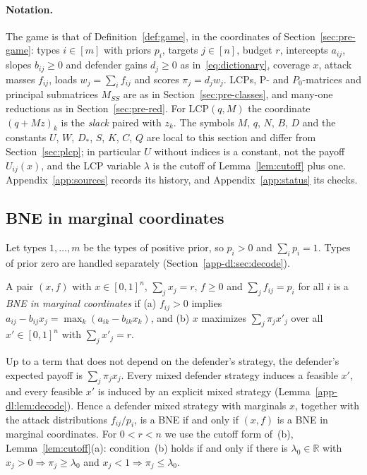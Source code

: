\paragraph{Notation.} The game is that of Definition~\ref{def:game}, in the coordinates of
Section~\ref{sec:pre-game}: types $i\in[m]$ with priors $p_i$, targets $j\in[n]$, budget $r$, intercepts
$a_{ij}$, slopes $b_{ij}\ge0$ and defender gains $d_j\ge0$ as in~\eqref{eq:dictionary}, coverage $x$,
attack masses $f_{ij}$, loads $w_j=\sum_if_{ij}$ and scores $\pi_j=d_jw_j$. LCPs, P- and $P_0$-matrices
and principal submatrices $M_{SS}$ are as in Section~\ref{sec:pre-classes}, and many-one reductions as in
Section~\ref{sec:pre-red}. For $\mathrm{LCP}(q,M)$ the coordinate $(q+Mz)_k$ is the \emph{slack} paired
with $z_k$. The symbols $M$, $q$, $N$, $B$, $D$ and the constants $U$, $W$, $D_*$, $S$, $K$, $C$, $Q$ are
local to this section and differ from Section~\ref{sec:plcp}; in particular $U$ without indices is a constant,
not the payoff $U_{ij}(x)$, and the LCP variable $\lambda$ is the cutoff of Lemma~\ref{lem:cutoff} plus
one. Appendix~\ref{app:sources} records its history, and Appendix~\ref{app:status} its checks.

\subsection{BNE in marginal coordinates}\label{app-dl:sec:bne}

Let types $1,\dots,m$ be the types of positive prior, so $p_i>0$ and $\sum_ip_i=1$. Types of prior zero
are handled separately (Section~\ref{app-dl:sec:decode}).

\begin{definition}\label{app-dl:def:bne}
A pair $(x,f)$ with $x\in[0,1]^n$, $\sum_jx_j=r$, $f\ge0$ and $\sum_jf_{ij}=p_i$ for all $i$ is a
\emph{BNE in marginal coordinates} if (a) $f_{ij}>0$ implies $a_{ij}-b_{ij}x_j=\max_k(a_{ik}-b_{ik}x_k)$,
and (b) $x$ maximizes $\sum_j\pi_jx'_j$ over all $x'\in[0,1]^n$ with $\sum_jx'_j=r$.
\end{definition}

Up to a term that does not depend on the defender's strategy, the defender's expected payoff is
$\sum_j\pi_jx_j$. Every mixed defender strategy induces a feasible $x'$, and every feasible $x'$ is
induced by an explicit mixed strategy (Lemma~\ref{app-dl:lem:decode}). Hence a defender mixed strategy
with marginals $x$, together with the attack distributions $f_{ij}/p_i$, is a BNE if and only if $(x,f)$
is a BNE in marginal coordinates. For $0<r<n$ we use the cutoff form of~(b), Lemma~\ref{lem:cutoff}(a):
condition~(b) holds if and only if there is $\lambda_0\in\mathbb R$ with
$x_j>0\Rightarrow\pi_j\ge\lambda_0$ and $x_j<1\Rightarrow\pi_j\le\lambda_0$.

